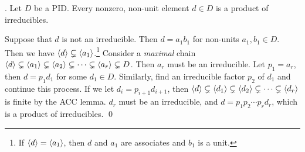 \thm. Let \(D\) be a PID. Every nonzero, non-unit element \(d \in D\) is a product of irreducibles.

\pf Suppose that \(d\) is not an irreducible. Then \(d = a_1b_1\) for non-units \(a_1, b_1 \in D\). Then we have \(\left\langle d \right\rangle \subsetneq \left\langle a_1 \right\rangle\).\footnote{If \(\left\langle d \right\rangle = \left\langle a_1 \right\rangle\), then \(d\) and \(a_1\) are associates and \(b_1\) is a unit.} Consider a \textit{maximal} chain \(\left\langle d \right\rangle \subsetneq \left\langle a_1 \right\rangle \subsetneq \left\langle a_2 \right\rangle \subsetneq \cdots \subsetneq \left\langle a_r \right\rangle \subsetneq D\). Then \(a_r\) must be an irreducible. Let \(p_1 = a_r\), then \(d = p_1 d_1\) for some \(d_1 \in D\). Similarly, find an irreducible factor \(p_2\) of \(d_1\) and continue this process. If we let \(d_i = p_{i+1}d_{i+1}\), then \(\left\langle d \right\rangle \subsetneq \left\langle d_1 \right\rangle \subsetneq \left\langle d_2 \right\rangle \subsetneq \cdots \subsetneq \left\langle d_{r} \right\rangle\) is finite by the ACC lemma. \(d_r\) must be an irreducible, and \(d = p_1 p_2 \cdots p_rd_r\), which is a product of irreducibles. \qed

\pagebreak
